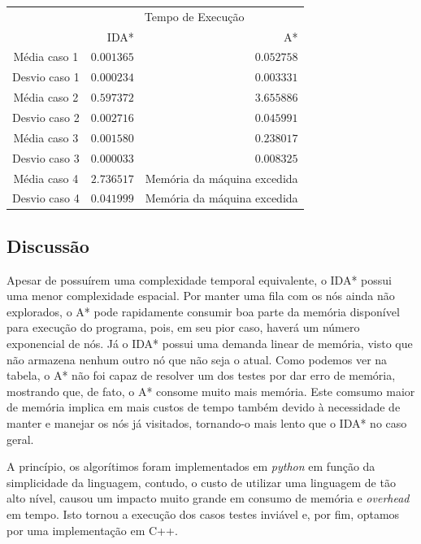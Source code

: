 \documentclass[12pt,a4paper]{article}
\begin{document}
\begin{center}
    \begin{tabular}{c|r|r|}
        \cline{2-3}
        & \multicolumn{2}{c|}{Tempo de Execução} \\
        \cline{2-3}
        & IDA* & A* \\
        \cline{2-3}
        \hline
        \multicolumn{1}{|c|}{Média caso 1} & $ 0.001365 $ & $ 0.052758 $ \\
        \hline
        \multicolumn{1}{|c|}{Desvio caso 1} & $ 0.000234 $ & $ 0.003331 $ \\
        \hline
        \multicolumn{1}{|c|}{Média caso 2} & $ 0.597372 $ & $ 3.655886 $ \\
        \hline
        \multicolumn{1}{|c|}{Desvio caso 2} & $ 0.002716 $ & $ 0.045991 $ \\
        \hline
        \multicolumn{1}{|c|}{Média caso 3} & $ 0.001580 $ & $ 0.238017 $ \\
        \hline
        \multicolumn{1}{|c|}{Desvio caso 3} & $ 0.000033 $ & $ 0.008325 $ \\
        \hline
        \multicolumn{1}{|c|}{Média caso 4} & $ 2.736517 $ & Memória da máquina excedida \\
        \hline
        \multicolumn{1}{|c|}{Desvio caso 4} & $ 0.041999 $ & Memória da máquina excedida \\
        \hline
    \end{tabular}
\end{center} \par

\subsection{Discussão}

    \par Apesar de possuírem uma complexidade temporal equivalente, o IDA* possui uma menor complexidade espacial. Por manter uma fila com os nós ainda não explorados, o A* pode rapidamente consumir boa parte da memória disponível para execução do programa, pois, em seu pior caso, haverá um número exponencial de nós. Já o IDA* possui uma demanda linear de memória, visto que não armazena nenhum outro nó que não seja o atual. Como podemos ver na tabela, o A* não foi capaz de resolver um dos testes por dar erro de memória, mostrando que, de fato, o A* consome muito mais memória. Este comsumo maior de memória implica em mais custos de tempo também devido à necessidade de manter e manejar os nós já visitados, tornando-o mais lento que o IDA* no caso geral.
    \par A princípio, os algorítimos foram implementados em \textit{python} em função da simplicidade da linguagem, contudo, o custo de utilizar uma linguagem de tão alto nível, causou um impacto muito grande em consumo de memória e {\it overhead} em tempo. Isto tornou a execução dos casos testes inviável e, por fim, optamos por uma implementação em C++.
\end{document}
